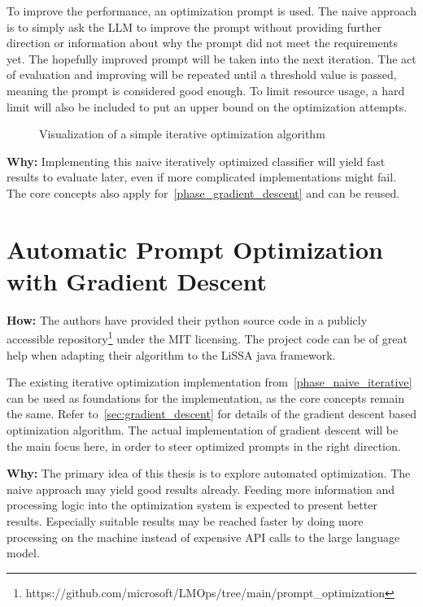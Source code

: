 To improve the performance, an optimization prompt is used.
The naive approach is to simply ask the LLM to improve the prompt without providing further direction or information about why the prompt did not meet the requirements yet.
The hopefully improved prompt will be taken into the next iteration.
The act of evaluation and improving will be repeated until a threshold value is passed, meaning the prompt is considered good enough.
To limit resource usage, a hard limit will also be included to put an upper bound on the optimization attempts.

\begin{figure}
    \centering
    
    \caption{Visualization of a simple iterative optimization algorithm}
    \label{fig:iterative_core_loop}
\end{figure}

\textbf{Why:} Implementing this naive iteratively optimized classifier will yield fast results to evaluate later, even if more complicated implementations might fail.
The core concepts also apply for~\ref{phase_gradient_descent} and can be reused.


\section{Automatic Prompt Optimization with Gradient Descent}
\label{approach:sec:gradient_descent}
\textbf{How:} The authors have provided their python source code in a publicly accessible repository\footnote{https://github.com/microsoft/LMOps/tree/main/prompt\_optimization} under the MIT licensing.
The project code can be of great help when adapting their algorithm to the LiSSA java framework.

The existing iterative optimization implementation from~\ref{phase_naive_iterative} can be used as foundations for the implementation, as the core concepts remain the same.
Refer to~\ref{sec:gradient_descent} for details of the gradient descent based optimization algorithm.
The actual implementation of gradient descent will be the main focus here, in order to steer optimized prompts in the right direction.


\textbf{Why:} The primary idea of this thesis is to explore automated optimization.
The naive approach may yield good results already.
Feeding more information and processing logic into the optimization system is expected to present better results.
Especially suitable results may be reached faster by doing more processing on the machine instead of expensive API calls to the large language model.


